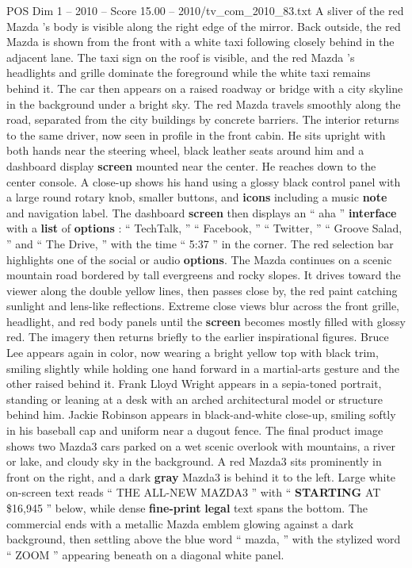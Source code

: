 \begin{textsample}{POS Dim 1 – 2010 – Score 15.00 – 2010/tv\_com\_2010\_83.txt}
A sliver of the red Mazda ’s body is visible along the right edge of the mirror.
Back outside, the red Mazda is shown from the front with a white taxi following closely behind in the adjacent lane.
The taxi sign on the roof is visible, and the red Mazda ’s headlights and grille dominate the foreground while the white taxi remains behind it.
The car then appears on a raised roadway or bridge with a city skyline in the background under a bright sky.
The red Mazda travels smoothly along the road, separated from the city buildings by concrete barriers.
The interior returns to the same driver, now seen in profile in the front cabin.
He sits upright with both hands near the steering wheel, black leather seats around him and a dashboard display \textbf{screen} mounted near the center.
He reaches down to the center console.
A close-up shows his hand using a glossy black control panel with a large round rotary knob, smaller buttons, and \textbf{icons} including a music \textbf{note} and navigation label.
The dashboard \textbf{screen} then displays an “ aha ” \textbf{interface} with a \textbf{list} of \textbf{options} : “ TechTalk, ” “ Facebook, ” “ Twitter, ” “ Groove Salad, ” and “ The Drive, ” with the time “ 5:37 ” in the corner.
The red selection bar highlights one of the social or audio \textbf{options}.
The Mazda continues on a scenic mountain road bordered by tall evergreens and rocky slopes.
It drives toward the viewer along the double yellow lines, then passes close by, the red paint catching sunlight and lens-like reflections.
Extreme close views blur across the front grille, headlight, and red body panels until the \textbf{screen} becomes mostly filled with glossy red.
The imagery then returns briefly to the earlier inspirational figures.
Bruce Lee appears again in color, now wearing a bright yellow top with black trim, smiling slightly while holding one hand forward in a martial-arts gesture and the other raised behind it.
Frank Lloyd Wright appears in a sepia-toned portrait, standing or leaning at a desk with an arched architectural model or structure behind him.
Jackie Robinson appears in black-and-white close-up, smiling softly in his baseball cap and uniform near a dugout fence.
The final product image shows two Mazda3 cars parked on a wet scenic overlook with mountains, a river or lake, and cloudy sky in the background.
A red Mazda3 sits prominently in front on the right, and a dark \textbf{gray} Mazda3 is behind it to the left.
Large white on-screen text reads “ THE ALL-NEW MAZDA3 ” with “ \textbf{STARTING} AT \$16,945 ” below, while dense \textbf{fine-print} \textbf{legal} text spans the bottom.
The commercial ends with a metallic Mazda emblem glowing against a dark background, then settling above the blue word “ mazda, ” with the stylized word “ ZOOM ” appearing beneath on a diagonal white panel.

\end{textsample}
